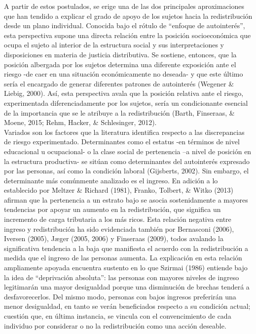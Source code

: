 \documentclass[12pt,letterpaper]{article}
\begin{document}
A partir de estos postulados, se erige una de las dos principales aproximaciones que han tendido a explicar el grado de apoyo de los sujetos hacia la redistribución desde un plano individual. Conocida bajo el rótulo de “enfoque de autointerés”, esta perspectiva supone una directa relación entre la posición socioeconómica que ocupa el sujeto al interior de la estructura social y sus interpretaciones y disposiciones en materia de justicia distributiva. Se sostiene, entonces, que la posición albergada por los sujetos determina una diferente exposición ante el riesgo -de caer en una situación económicamente no deseada- y que este último sería el encargado de generar diferentes patrones de autointerés (Wegener \& Liebig, 2000). Así, esta perspectiva avala que la posición relativa ante el riesgo, experimentada diferenciadamente por los sujetos, sería un condicionante esencial de la importancia que se le atribuye a la redistribución (Barth, Finseraas, \& Moene, 2015; Rehm, Hacker, \& Schlesinger, 2012).\\

Variados son los factores que la literatura identifica respecto a las discrepancias de riesgo experimentado. Determinantes como el estatus -en términos de nivel educacional u ocupacional- o la clase social de pertenencia –a nivel de posición en la estructura productiva- se sitúan como determinantes del autointerés expresado por las personas, así como la condición laboral (Gijsberts, 2002). Sin embargo, el determinante más comúnmente analizado es el ingreso. En adición a lo establecido por Meltzer \& Richard (1981), Franko, Tolbert, \& Witko (2013) afirman que la pertenencia a un estrato bajo se asocia sostenidamente a mayores tendencias por apoyar un aumento en la redistribución, que significa un incremento de carga tributaria a los más ricos. Esta relación negativa entre ingreso y redistribución ha sido evidenciada también por Bernasconi (2006), Iversen (2005), Jæger (2005, 2006) y Finseraas (2009), todos avalando la significativa tendencia a la baja que manifiesta el acuerdo con la redistribución a medida que el ingreso de las personas aumenta. La explicación en esta relación ampliamente apoyada encuentra sustento en lo que Szirmai (1986) entiende bajo la idea de “deprivación absoluta”: las personas con mayores niveles de ingreso legitimarán una mayor desigualdad porque una disminución de brechas tenderá a desfavorecerlos. Del mismo modo, personas con bajos ingresos preferirán una menor desigualdad, en tanto se verán beneficiados respecto a su condición actual; cuestión que, en última instancia, se vincula con el convencimiento de cada individuo por considerar o no la redistribución como una acción deseable.
\end{document}
